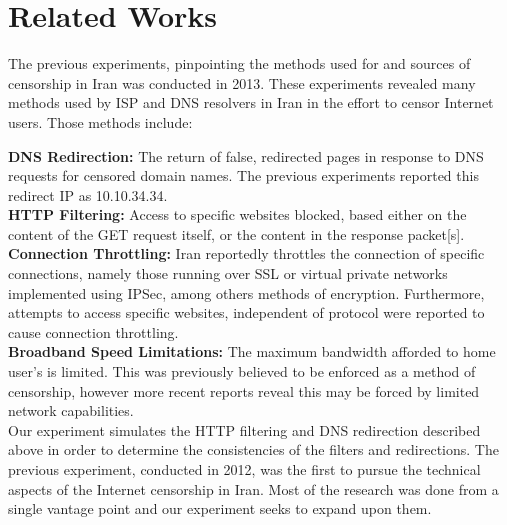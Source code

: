 \section{Related Works}\label{sec:relatedworks}
The previous experiments, pinpointing the methods used for and sources of censorship in Iran was conducted in 2013. These experiments revealed many methods used by ISP and DNS resolvers in Iran in the effort to censor Internet users. Those methods include:

\textbf{DNS Redirection:} The return of false, redirected pages in response to DNS requests for censored domain names. The previous experiments reported this redirect IP as 10.10.34.34.\\
\textbf{HTTP Filtering:} Access to specific websites blocked, based either on the content of the GET request itself, or the content in the response packet[s].\\
\textbf{Connection Throttling:} Iran reportedly throttles the connection of specific connections, namely those running over SSL or virtual private networks implemented using IPSec, among others methods of encryption. Furthermore, attempts to access specific websites, independent of protocol were reported to cause connection throttling.\\
\textbf{Broadband Speed Limitations:} The maximum bandwidth afforded to home user’s is limited. This was previously believed to be enforced as a method of censorship, however more recent reports reveal this may be forced by limited network capabilities.\\
Our experiment simulates the HTTP filtering and DNS redirection described above in order to determine the consistencies of  the filters and redirections. The previous experiment, conducted in 2012, was the first to pursue the technical aspects of the Internet censorship in Iran. Most of the research was done from a single vantage point and our experiment seeks to expand upon them.\\

